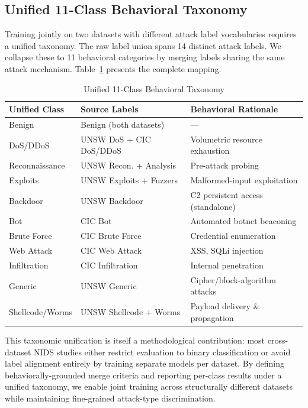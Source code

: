 \documentclass[compsoc,journal]{IEEEtran}
\begin{document}
\subsection{Unified 11-Class Behavioral Taxonomy}

Training jointly on two datasets with different attack label vocabularies requires a unified taxonomy. The raw label union spans 14 distinct attack labels. We collapse these to 11 behavioral categories by merging labels sharing the same attack mechanism. Table~\ref{tab:taxonomy} presents the complete mapping.

\begin{table}[t]
\centering
\caption{Unified 11-Class Behavioral Taxonomy}
\label{tab:taxonomy}
\small
\begin{tabular}{p{2.0cm}p{2.6cm}p{3.4cm}}
\toprule
\textbf{Unified Class} & \textbf{Source Labels} & \textbf{Behavioral Rationale} \\
\midrule
Benign & Benign (both datasets) & — \\
DoS/DDoS & UNSW DoS + CIC DoS/DDoS & Volumetric resource exhaustion \\
Reconnaissance & UNSW Recon. + Analysis & Pre-attack probing \\
Exploits & UNSW Exploits + Fuzzers & Malformed-input exploitation \\
Backdoor & UNSW Backdoor & C2 persistent access (standalone) \\
Bot & CIC Bot & Automated botnet beaconing \\
Brute Force & CIC Brute Force & Credential enumeration \\
Web Attack & CIC Web Attack & XSS, SQLi injection \\
Infiltration & CIC Infiltration & Internal penetration \\
Generic & UNSW Generic & Cipher/block-algorithm attacks \\
Shellcode/Worms & UNSW Shellcode + Worms & Payload delivery \& propagation \\
\bottomrule
\end{tabular}
\end{table}

This taxonomic unification is itself a methodological contribution: most cross-dataset NIDS studies either restrict evaluation to binary classification or avoid label alignment entirely by training separate models per dataset. By defining behaviorally-grounded merge criteria and reporting per-class results under a unified taxonomy, we enable joint training across structurally different datasets while maintaining fine-grained attack-type discrimination.
\end{document}
